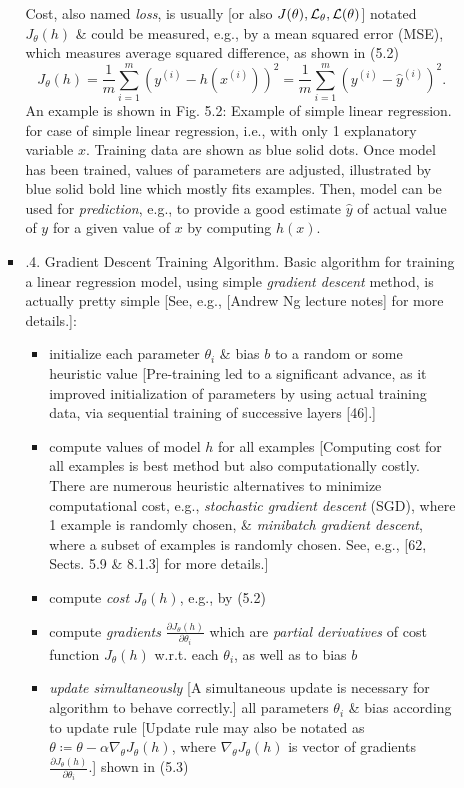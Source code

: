\documentclass{article}
\begin{document}
\begin{itemize}
\begin{itemize}
\begin{itemize}
			Cost, also named {\it loss}, is usually [or also $J(\theta),{\cal L}_\theta,{\cal L}(\theta)$] notated $J_\theta(h)$ \& could be measured, e.g., by a mean squared error (MSE), which measures average squared difference, as shown in (5.2)
			\begin{equation*}
				J_\theta(h) = \frac{1}{m}\sum_{i=1}^m (y^{(i)} - h(x^{(i)}))^2 = \frac{1}{m}\sum_{i=1}^m (y^{(i)} - \hat{y}^{(i)})^2.
			\end{equation*}
			An example is shown in {\sf Fig. 5.2: Example of simple linear regression.} for case of simple linear regression, i.e., with only 1 explanatory variable $x$. Training data are shown as blue solid dots. Once model has been trained, values of parameters are adjusted, illustrated by blue solid bold line which mostly fits examples. Then, model can be used for {\it prediction}, e.g., to provide a good estimate $\hat{y}$ of actual value of $y$ for a given value of $x$ by computing $h(x)$.
			\item {.4. Gradient Descent Training Algorithm.} Basic algorithm for training a linear regression model, using simple {\it gradient descent} method, is actually pretty simple [See, e.g., [{\sc Andrew Ng} lecture notes] for more details.]:
			\begin{itemize}
				\item initialize each parameter $\theta_i$ \& bias $b$ to a random or some heuristic value [Pre-training led to a significant advance, as it improved initialization of parameters by using actual training data, via sequential training of successive layers [46].]
				\item compute values of model $h$ for all examples [Computing cost for all examples is best method but also computationally costly. There are numerous heuristic alternatives to minimize computational cost, e.g., {\it stochastic gradient descent} (SGD), where 1 example is randomly chosen, \& {\it minibatch gradient descent}, where a subset of examples is randomly chosen. See, e.g., [62, Sects. 5.9 \& 8.1.3] for more details.]
				\item compute {\it cost} $J_\theta(h)$, e.g., by (5.2)
				\item compute {\it gradients} $\frac{\partial J_\theta(h)}{\partial\theta_i}$ which are {\it partial derivatives} of cost function $J_\theta(h)$ w.r.t. each $\theta_i$, as well as to bias $b$
				\item {\it update simultaneously} [A simultaneous update is necessary for algorithm to behave correctly.] all parameters $\theta_i$ \& bias according to update rule [Update rule may also be notated as $\theta\coloneqq\theta - \alpha\nabla_\theta J_\theta(h)$, where $\nabla_\theta J_\theta(h)$ is vector of gradients $\frac{\partial J_\theta(h)}{\partial\theta_i}$.] shown in (5.3)

\end{itemize}
\end{itemize}
\end{itemize}
\end{itemize}
\end{document}
